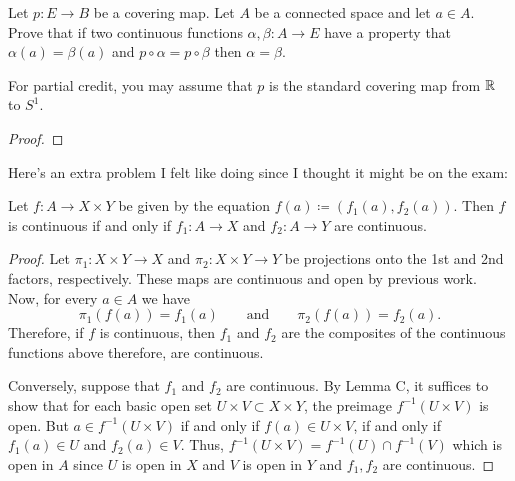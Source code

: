 \begin{problem}
Let $p\colon E\to B$ be a covering map. Let $A$ be a connected space and
let $a\in A$. Prove that if two continuous functions $\alpha,\beta\colon
A\to E$ have a property that $\alpha(a)=\beta(a)$ and
$p\circ\alpha=p\circ\beta$ then $\alpha=\beta$.

For partial credit, you may assume that $p$ is the standard covering map
from $\mathbb{R}$ to $S^1$.
\end{problem}
\begin{proof}
\end{proof}

Here's an extra problem I felt like doing since I thought it might be on
the exam:
\begin{problem*}
\begin{theorem*}
Let $f\colon A\to X\times Y$ be given by the equation
$f(a)\coloneqq(f_1(a),f_2(a))$. Then $f$ is continuous if and only if
$f_1\colon A\to X$ and $f_2\colon A\to Y$ are continuous.
\end{theorem*}
\end{problem*}
\begin{proof}
Let $\pi_1\colon X\times Y\to X$ and $\pi_2\colon X\times Y\to Y$ be
projections onto the 1st and 2nd factors, respectively. These maps are
continuous and open by previous work. Now, for every $a\in A$ we have
\[
\pi_1(f(a))=f_1(a)\qquad\text{and}\qquad
\pi_2(f(a))=f_2(a).
\]
Therefore, if $f$ is continuous, then $f_1$ and $f_2$ are the composites of
the continuous functions above therefore, are continuous.

Conversely, suppose that $f_1$ and $f_2$ are continuous. By Lemma C, it
suffices to show that for each basic open set $U\times V\subset X\times Y$,
the preimage $f^{-1}(U\times V)$ is open. But $a\in f^{-1}(U\times V)$ if
and only if $f(a)\in U\times V$, if and only if $f_1(a)\in U$ and
$f_2(a)\in V$. Thus, $f^{-1}(U\times V)=f^{-1}(U)\cap f^{-1}(V)$ which is
open in $A$ since $U$ is open in $X$ and $V$ is open in $Y$ and $f_1,f_2$
are continuous.
\end{proof}

